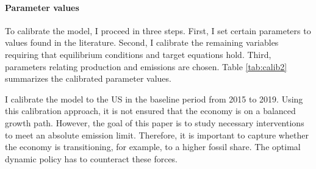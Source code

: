 
\paragraph{Parameter values}
To calibrate the model, I proceed in three steps. First, I set certain parameters to values found in the literature. Second, I calibrate the remaining variables requiring that equilibrium conditions and target equations hold. Third, parameters relating production and emissions are chosen. Table \ref{tab:calib2} summarizes the calibrated parameter values.

I calibrate the model to the US in the baseline period from 2015 to 2019. Using this calibration approach, it is not ensured that the economy is on a balanced growth path. However, the goal of this paper is to study necessary interventions to meet an absolute emission limit. Therefore, %
it is important to capture whether the economy is transitioning, for example, to %
a higher fossil share. The optimal dynamic policy has to counteract these forces. %


